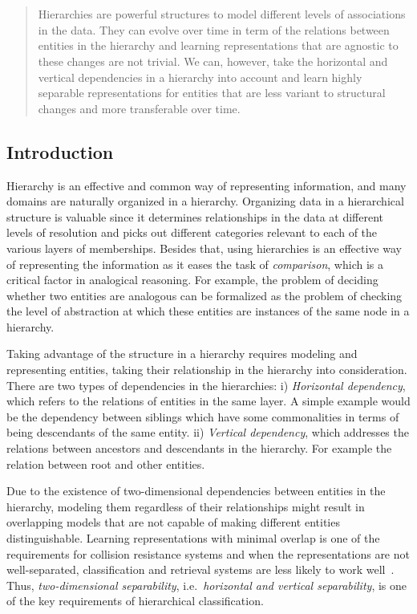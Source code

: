 \chapter{}
\label{chap:3}
%
\begin{quote}
Hierarchies are powerful structures to model different levels of associations in the data. They can evolve over time in term of the relations between entities in the hierarchy and learning representations that are agnostic to these changes are not trivial. We can, however, take the horizontal and vertical dependencies in a hierarchy into account and learn highly separable representations for entities that are less variant to structural changes and more transferable over time. 
\end{quote}
%
\section{Introduction}
Hierarchy is an effective and common way of representing information, and many domains are naturally organized in a hierarchy. Organizing data in a hierarchical structure is valuable since it determines relationships in the data at different levels of resolution and picks out different categories relevant to each of the various layers of memberships.  
Besides that, using hierarchies is an effective way of representing the information as it eases the task of \emph{comparison}, which is a critical factor in analogical reasoning. For example, the problem of deciding whether two entities are analogous can be formalized as the problem of checking the level of abstraction at which these entities are instances of the same node in a hierarchy.

Taking advantage of the structure in a hierarchy requires modeling and representing entities, taking their relationship in the hierarchy into consideration. 
There are two types of dependencies in the hierarchies: i) \emph{Horizontal dependency}, which refers to the relations of entities in the same layer.  A simple example would be the dependency between siblings which have some commonalities in terms of being descendants of the same entity. ii) \emph{Vertical dependency}, which addresses the relations between ancestors and descendants in the hierarchy. For example the relation between root and other entities. 

Due to the existence of two\:-\:dimensional dependencies between entities in the hierarchy, modeling them regardless of their relationships might result in overlapping models that are not capable of making different entities distinguishable.  Learning representations with minimal overlap is one of the requirements for collision resistance systems and when the representations are not well\:-\:separated, classification and retrieval systems are less likely to work well~\citep{Lewis:1992}. 
Thus, \emph{two\:-\:dimensional separability}, i.e.\ \emph{horizontal and vertical separability}, is one of the key requirements of hierarchical classification.

